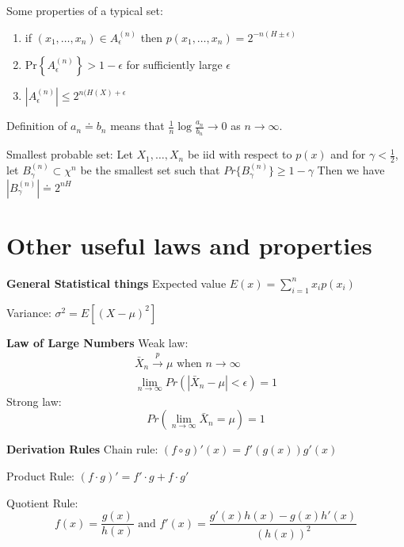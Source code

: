 \documentclass[10pt]{article}
\begin{document}
\begin{scriptsize}
\begin{multicols}{3}
Some properties of a typical set:
\begin{enumerate}
\item if $(x_1,\ldots,x_n) \in A_\epsilon^{(n)}$ then $p(x_1,\ldots,x_n) = 2^{-n(H\pm \epsilon)}$
\item Pr$\left\{A_\epsilon^{(n)}\right\}>1-\epsilon$ for sufficiently large $\epsilon$
\item $|A_\epsilon^{(n)}| \leq 2^{n(H(X)+\epsilon}$
\end{enumerate}

Definition of $a_n \doteq b_n$ means that $\frac{1}{n}\log \frac{a_n}{b_n} \rightarrow 0$ as $n\rightarrow \infty$.

Smallest probable set: Let $X_1,\ldots, X_n$ be iid with respect to $p(x)$ and for $\gamma < \frac{1}{2}$, let $B_\gamma^{(n)} \subset \chi^n$ be the smallest set such that $Pr\{ B_\gamma^{(n)} \} \geq 1-\gamma $ Then we have $|B_\gamma^{(n)}| \doteq 2^{nH}$

\section*{Other useful laws and properties}
{\bf General Statistical things} Expected value $E(x)=\sum_{i=1}^n x_i p(x_i)$

Variance: $\sigma^2 = E\left[ \left(X-\mu\right)^2\right]$

{\bf Law of Large Numbers} Weak law:
\begin{eqnarray*}
\bar{X}_n\overset{p}\rightarrow \mu \text{ when } n \rightarrow \infty\\
\lim_{n\rightarrow \infty} Pr\left(|\bar{X}_n-\mu| < \epsilon \right) = 1
\end{eqnarray*}
Strong law:
\begin{equation}
Pr\left(\lim_{n\rightarrow \infty} \bar{X}_n = \mu \right) = 1
\end{equation}

{\bf Derivation Rules} Chain rule: $(f \circ g)'(x)=f'(g(x))g'(x)$

Product Rule: $(f\cdot g)' = f' \cdot g + f \cdot g'$

Quotient Rule: \[f(x)=\frac{g(x)}{h(x)}\text{ and }f'(x)=\frac{g'(x)h(x)-g(x)h'(x)}{\left(h(x)\right)^2}\]



\end{multicols}
\end{scriptsize}
\end{document}
